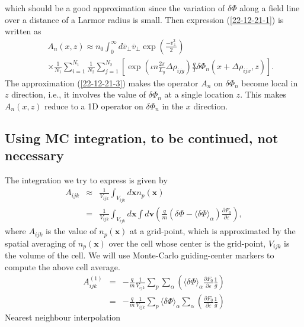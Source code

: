 \documentclass{article}
\begin{document}
which should be a good approximation since the variation of $\delta \Phi$
along a field line over a distance of a Larmor radius is small. Then
expression (\ref{22-12-21-1}) is written as
\begin{eqnarray}
  &  & A_n (x, z) \approx n_0  \int_0^{\infty} d \overline{v}_{\perp}
  \overline{v}_{\perp} \exp \left( \frac{- \overline{v}^2_{\perp}}{2} \right)
  \nonumber\\
  &  & \times \frac{1}{N_1} \sum_{i = 1}^{N_1} \frac{1}{N_2}  \sum_{j =
  1}^{N_2} \left[ \exp \left( \iota n \frac{2 \pi}{L_y} \Delta \rho_{i j y}
  \right) \frac{q}{T} \delta \Phi_n (x + \Delta \rho_{i j x}, z) \right] . 
\end{eqnarray}
The approximation (\ref{22-12-21-3}) makes the operator $A_n$ on $\delta
\Phi_n$ become local in $z$ direction, i.e., it involves the value of $\delta
\Phi_n$ at a single location $z$. This makes $A_n (x, z)$ reduce to a 1D
operator on $\delta \Phi_n$ in the $x$ direction.

\subsection{Using MC integration, to be continued, not necessary}

The integration we try to express is given by
\begin{eqnarray}
  A_{i j k} & \approx & \frac{1}{V_{i j k}} \int_{V_{i j k}} d\mathbf{x}n_p
  (\mathbf{x}) \nonumber\\
  & = & \frac{1}{V_{i j k}} \int_{V_{i j k}} d\mathbf{x} \int d\mathbf{v}
  \left( \frac{q}{m} (\delta \Phi - \langle \delta \Phi \rangle_{\alpha})
  \frac{\partial F_0}{\partial \varepsilon} \right), 
\end{eqnarray}
where $A_{i j k}$ is the value of $n_p (\mathbf{x})$ at a grid-point, which is
approximated by the spatial averaging of $n_p (\mathbf{x})$ over the cell
whose center is the grid-point, $V_{i j k}$ is the volume of the cell. We will
use Monte-Carlo guiding-center markers to compute the above cell average.
\begin{eqnarray*}
  A_{i j k}^{(1)} & = & - \frac{q}{m} \frac{1}{V_{i j k}} \sum_p \sum_{\alpha}
  \left( \langle \delta \Phi \rangle_{\alpha} \frac{\partial F_0}{\partial
  \varepsilon} \frac{1}{g} \right)\\
  & = & - \frac{q}{m} \frac{1}{V_{i j k} } \sum_p \langle \delta \Phi
  \rangle_{\alpha} \sum_{\alpha} \left( \frac{\partial F_0}{\partial
  \varepsilon} \frac{1}{g} \right)
\end{eqnarray*}
Nearest neighbour interpolation
\end{document}
